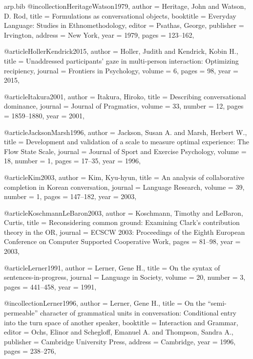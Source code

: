 \begin{filecontents*}[overwrite]{arp.bib}
@incollection{HeritageWatson1979,
  author    = {Heritage, John and Watson, D. Rod},
  title     = {Formulations as conversational objects},
  booktitle = {Everyday Language: Studies in Ethnomethodology},
  editor    = {Psathas, George},
  publisher = {Irvington},
  address   = {New York},
  year      = {1979},
  pages     = {123--162},
}

@article{HollerKendrick2015,
  author  = {Holler, Judith and Kendrick, Kobin H.},
  title   = {Unaddressed participants' gaze in multi-person interaction: Optimizing recipiency},
  journal = {Frontiers in Psychology},
  volume  = {6},
  pages   = {98},
  year    = {2015},
}

@article{Itakura2001,
  author  = {Itakura, Hiroko},
  title   = {Describing conversational dominance},
  journal = {Journal of Pragmatics},
  volume  = {33},
  number  = {12},
  pages   = {1859--1880},
  year    = {2001},
}

@article{JacksonMarsh1996,
  author  = {Jackson, Susan A. and Marsh, Herbert W.},
  title   = {Development and validation of a scale to measure optimal experience: The {Flow State Scale}},
  journal = {Journal of Sport and Exercise Psychology},
  volume  = {18},
  number  = {1},
  pages   = {17--35},
  year    = {1996},
}

@article{Kim2003,
  author  = {Kim, Kyu-hyun},
  title   = {An analysis of collaborative completion in {Korean} conversation},
  journal = {Language Research},
  volume  = {39},
  number  = {1},
  pages   = {147--182},
  year    = {2003},
}

@article{KoschmannLeBaron2003,
  author  = {Koschmann, Timothy and LeBaron, Curtis},
  title   = {Reconsidering common ground: Examining {Clark}'s contribution theory in the {OR}},
  journal = {ECSCW 2003: Proceedings of the Eighth European Conference on Computer Supported Cooperative Work},
  pages   = {81--98},
  year    = {2003},
}

@article{Lerner1991,
  author  = {Lerner, Gene H.},
  title   = {On the syntax of sentences-in-progress},
  journal = {Language in Society},
  volume  = {20},
  number  = {3},
  pages   = {441--458},
  year    = {1991},
}

@incollection{Lerner1996,
  author    = {Lerner, Gene H.},
  title     = {On the ``semi-permeable'' character of grammatical units in conversation: Conditional entry into the turn space of another speaker},
  booktitle = {Interaction and Grammar},
  editor    = {Ochs, Elinor and Schegloff, Emanuel A. and Thompson, Sandra A.},
  publisher = {Cambridge University Press},
  address   = {Cambridge},
  year      = {1996},
  pages     = {238--276},
}


\end{filecontents*}
